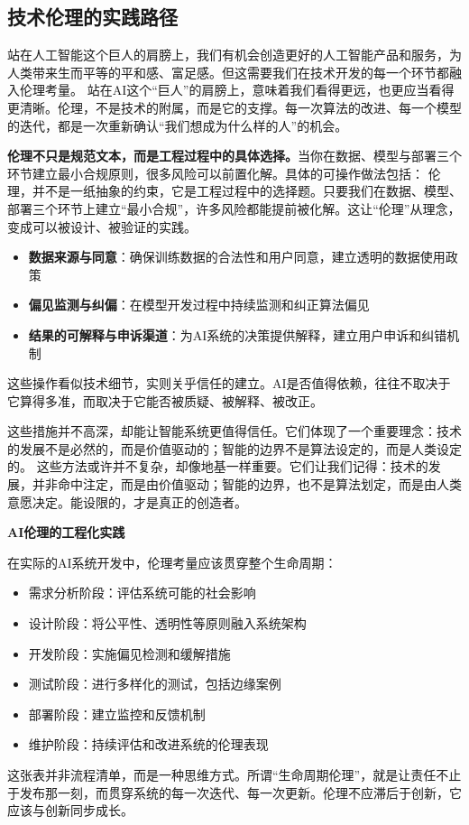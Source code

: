 \subsection{技术伦理的实践路径}

站在人工智能这个巨人的肩膀上，我们有机会创造更好的人工智能产品和服务，为人类带来生而平等的平和感、富足感。但这需要我们在技术开发的每一个环节都融入伦理考量。
站在AI这个“巨人”的肩膀上，意味着我们看得更远，也更应当看得更清晰。伦理，不是技术的附属，而是它的支撑。每一次算法的改进、每一个模型的迭代，都是一次重新确认“我们想成为什么样的人”的机会。

{\bf 伦理不只是规范文本，而是工程过程中的具体选择。}当你在数据、模型与部署三个环节建立最小合规原则，很多风险可以前置化解。具体的可操作做法包括：
伦理，并不是一纸抽象的约束，它是工程过程中的选择题。只要我们在数据、模型、部署三个环节上建立“最小合规”，许多风险都能提前被化解。这让“伦理”从理念，变成可以被设计、被验证的实践。

\begin{itemize}
\item {\bf 数据来源与同意}：确保训练数据的合法性和用户同意，建立透明的数据使用政策
\item {\bf 偏见监测与纠偏}：在模型开发过程中持续监测和纠正算法偏见
\item {\bf 结果的可解释与申诉渠道}：为AI系统的决策提供解释，建立用户申诉和纠错机制
\end{itemize}
这些操作看似技术细节，实则关乎信任的建立。AI是否值得依赖，往往不取决于它算得多准，而取决于它能否被质疑、被解释、被改正。

这些措施并不高深，却能让智能系统更值得信任。它们体现了一个重要理念：技术的发展不是必然的，而是价值驱动的；智能的边界不是算法设定的，而是人类设定的。
这些方法或许并不复杂，却像地基一样重要。它们让我们记得：技术的发展，并非命中注定，而是由价值驱动；智能的边界，也不是算法划定，而是由人类意愿决定。能设限的，才是真正的创造者。

{\bf AI伦理的工程化实践}

在实际的AI系统开发中，伦理考量应该贯穿整个生命周期：
\begin{itemize}
\item 需求分析阶段：评估系统可能的社会影响
\item 设计阶段：将公平性、透明性等原则融入系统架构
\item 开发阶段：实施偏见检测和缓解措施
\item 测试阶段：进行多样化的测试，包括边缘案例
\item 部署阶段：建立监控和反馈机制
\item 维护阶段：持续评估和改进系统的伦理表现
\end{itemize}
这张表并非流程清单，而是一种思维方式。所谓“生命周期伦理”，就是让责任不止于发布那一刻，而贯穿系统的每一次迭代、每一次更新。伦理不应滞后于创新，它应该与创新同步成长。

